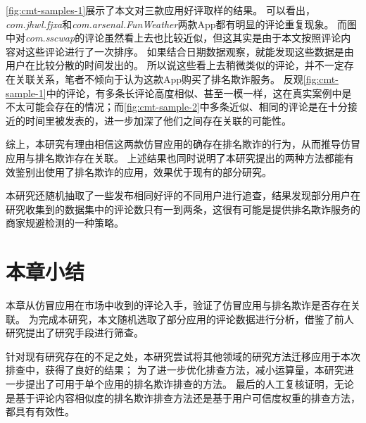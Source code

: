 \autoref{fig:cmt-samples-1}展示了本文对三款应用好评取样的结果。
可以看出，\emph{com.jhwl.fjxa}和\emph{com.arsenal.FunWeather}两款App都有明显的评论重复现象。
而图中对\emph{com.sscwap}的评论虽然看上去也比较近似，但这其实是由于本文按照评论内容对这些评论进行了一次排序。
如果结合日期数据观察，就能发现这些数据是由用户在比较分散的时间发出的。
所以说这些看上去稍微类似的评论，并不一定存在关联关系，笔者不倾向于认为这款App购买了排名欺诈服务。
反观\autoref{fig:cmt-sample-1}中的评论，有多条长评论高度相似、甚至一模一样，这在真实案例中是不太可能会存在的情况；而\autoref{fig:cmt-sample-2}中多条近似、相同的评论是在十分接近的时间里被发表的，进一步加深了他们之间存在关联的可能性。

综上，本研究有理由相信这两款仿冒应用的确存在排名欺诈的行为，从而推导仿冒应用与排名欺诈存在关联。
上述结果也同时说明了本研究提出的两种方法都能有效鉴别出使用了排名欺诈的应用，效果优于现有的部分研究。

本研究还随机抽取了一些发布相同好评的不同用户进行追查，结果发现部分用户在研究收集到的数据集中的评论数只有一到两条，这很有可能是提供排名欺诈服务的商家规避检测的一种策略。

\section{本章小结}
本章从仿冒应用在市场中收到的评论入手，验证了仿冒应用与排名欺诈是否存在关联。
为完成本研究，本文随机选取了部分应用的评论数据进行分析，借鉴了前人研究提出了研究手段进行筛查。

针对现有研究存在的不足之处，本研究尝试将其他领域的研究方法迁移应用于本次排查中，获得了良好的结果；
为了进一步优化排查方法，减小运算量，本研究进一步提出了可用于单个应用的排名欺诈排查的方法。
最后的人工复核证明，无论是基于评论内容相似度的排名欺诈排查方法还是基于用户可信度权重的排查方法，都具有有效性。
